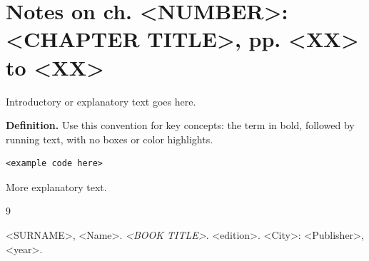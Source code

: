 \documentclass[12pt,a4paper]{article}
\newcommand{\term}[1]{\textbf{#1.}}
\newcommand{\bookTitle}{<BOOK TITLE>}
\newcommand{\fullReference}{%
	<SURNAME>, <Name>. \textit{\bookTitle}. <edition>. <City>: <Publisher>, <year>.%
}
\begin{document}
\section{Notes on ch. <NUMBER>: <CHAPTER TITLE>, pp. <XX> to <XX>}

Introductory or explanatory text goes here.

\term{Definition} Use this convention for key concepts: the term
in bold, followed by running text, with no boxes or color highlights.

\begin{lstlisting}
<example code here>
\end{lstlisting}

More explanatory text.

\newpage
\begin{thebibliography}{9}

	\fullReference

\end{thebibliography}
\end{document}
